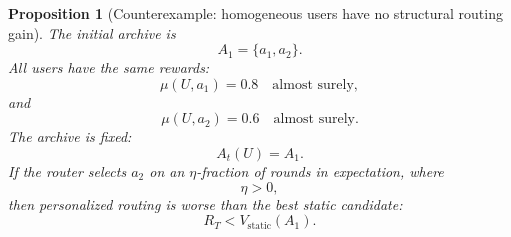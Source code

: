 \documentclass{article} %
\newtheorem{proposition}[theorem]{Proposition}
\begin{document}
\begin{proposition}[Counterexample: homogeneous users have no structural routing gain]
\label{prop:8}
The initial archive is
\begin{equation}
\label{eq:app-fourth-hom-a}
A_1
=
\{a_1,a_2\}.
\end{equation}
All users have the same rewards:
\begin{equation}
\label{eq:app-fourth-hom-mu1}
\mu(U,a_1)=0.8
\quad
\text{almost surely},
\end{equation}
and
\begin{equation}
\label{eq:app-fourth-hom-mu2}
\mu(U,a_2)=0.6
\quad
\text{almost surely}.
\end{equation}
The archive is fixed:
\begin{equation}
\label{eq:app-fourth-hom-fixed}
A_t(U)=A_1.
\end{equation}
If the router selects \(a_2\) on an \(\eta\)-fraction of rounds in expectation, where
\begin{equation}
\label{eq:app-fourth-hom-eta}
\eta>0,
\end{equation}
then personalized routing is worse than the best static candidate:
\begin{equation}
\label{eq:app-fourth-hom-loss}
R_T
<
V_{\mathrm{static}}(A_1).
\end{equation}
\end{proposition}
\end{document}
